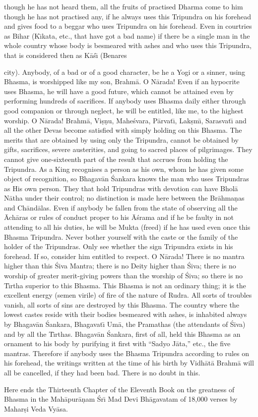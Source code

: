 though he has not heard them, all the fruits of practised Dharma come to him though he has not practised any, if he always uses this Tripundra on his forehead and gives food to a beggar who uses Tripundra on his forehead. Even in courtries as Bihar (K\={\i}kata, etc., that have got a bad name) if there be a single man in the whole country whose body is besmeared with ashes and who uses this Tripundra, that is considered then as K\=a\'s\={\i} (Benares

city). Anybody, of a bad or of a good character, be he a Yogi or a sinner, using Bhasma, is worshipped like my son, Brahm\=a. O N\=arada! Even if an hypocrite uses Bhasma, he will have a good future, which cannot be attained even by performing hundreds of sacrifices. If anybody uses Bhasma daily either through good companion or through neglect, he will be entitled, like me, to the highest worship. O N\=arada! Brahm\=a, Vi\d{s}\d{n}u, Mahe\'svara, P\=arvat\={\i}, Lak\d{s}m\={\i}, Sarasvat\={\i} and all the other Devas become satisfied with simply holding on this Bhasma. The merits that are obtained by using only the Tripundra, cannot be obtained by gifts, sacrifices, severe austerities, and going to sacred places of pilgrimages. They cannot give one-sixteenth part of the result that accrues from holding the Tripundra. As a King recognises a person as his own, whom he has given some object of recognition, so Bhagav\=an \'Sankara knows the man who uses Tripundras as His own person. They that hold Tripundras with devotion can have Bhol\=a N\=atha under their control; no distinction is made here between the Br\=ahma\d{n}as and Ch\=and\=alas. Even if anybody be fallen from the state of observing all the \=Ach\=aras or rules of conduct proper to his \=A\'srama and if he be faulty in not attending to all his duties, he will be Mukta (freed) if he has used even once this Bhasma Tripundra. Never bother yourself with the caste or the family of the holder of the Tripundras. Only see whether the sign Tripundra exists in his forehead. If so, consider him entitled to respect. O N\=arada! There is no mantra higher than this \'Siva Mantra; there is no Deity higher than \'Siva; there is no worship of greater merit-giving powers than the worship of \'Siva; so there is no T\={\i}rtha superior to this Bhasma. This Bhasma is not an ordinary thing; it is the excellent energy (semen virile) of fire of the nature of Rudra. All sorts of troubles vanish, all sorts of sins are destroyed by this Bhasma. The country where the lowest castes reside with their bodies besmeared with ashes, is inhabited always by Bhagav\=an \'Sankara, Bhagavat\={\i} Um\=a, the Pramathas (the attendants of \'Siva) and by all the T\={\i}rthas. Bhagav\=an \'Sankara, first of all, held this Bhasma as an ornament to his body by purifying it first with ``Sadyo J\=ata,'' etc., the five mantras. Therefore if anybody uses the Bhasma Tripundra according to rules on his forehead, the writings written at the time of his birth by Vidh\=at\=a Brahm\=a will all be cancelled, if they had been bad. There is no doubt in this.

Here ends the Thirteenth Chapter of the Eleventh Book on the greatness of Bhasma in the Mah\=apur\=a\d{n}am \'Sr\={\i} Mad Devi Bh\=agavatam of 18,000 verses by Mahar\d{s}i Veda Vy\=asa.



